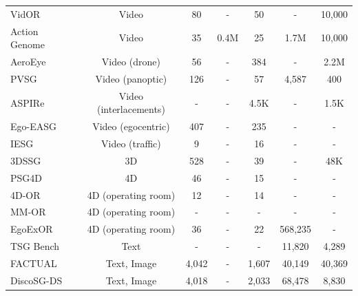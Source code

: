 \begin{table}[!t]
\begin{tabular}{lcccccc}
    VidOR~\cite{shang2019annotating} & Video & 80 & - & 50 & - & 10,000 \\
    Action Genome~\cite{ji2020action} & Video & 35 & 0.4M & 25 & 1.7M & 10,000 \\
    AeroEye~\cite{nguyen2024cyclo} & Video (drone) & 56 & - & 384 & - & 2.2M \\
    PVSG~\cite{yang2023panoptic} & Video (panoptic) & 126 & - & 57 & 4,587 & 400 \\
    ASPIRe~\cite{nguyen2024hig} & Video (interlacements) & - & - & 4.5K & - & 1.5K \\
    Ego-EASG~\cite{rodin2024action} & Video (egocentric) & 407 & - & 235 & - & - \\
    IESG~\cite{liu2023learning} & Video (traffic) & 9 & - & 16 & - & - \\
    3DSSG~\cite{wald2020learning} & 3D & 528 & - & 39 & - & 48K \\
    PSG4D~\cite{yang20234d} & 4D & 46 & - & 15 & - & - \\
    4D-OR~\cite{ozsoy20224d} & 4D (operating room) & 12 & - & 14 & - & - \\
    MM-OR~\cite{ozsoy2025mm} & 4D (operating room) & - & - & - & - & - \\
    EgoExOR~\cite{ozsoy2025egoexor} & 4D (operating room) & 36 & - & 22 & 568,235 & - \\
    TSG Bench~\cite{yang2025llm} & Text & - & - & - & 11,820 & 4,289 \\
    FACTUAL~\cite{li2023factual} & Text, Image & 4,042 & - & 1,607 & 40,149 & 40,369 \\
    DiscoSG-DS~\cite{lin2025discosg} & Text, Image & 4,018 & - & 2,033 & 68,478 & 8,830 \\
    \bottomrule
  \end{tabular}
\end{table}

